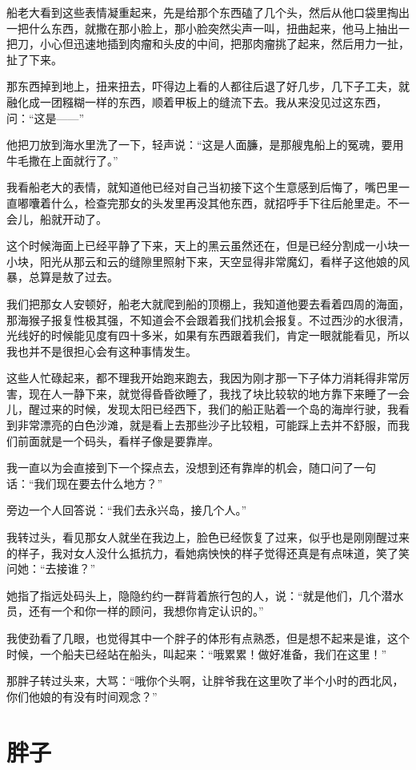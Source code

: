 船老大看到这些表情凝重起来，先是给那个东西磕了几个头，然后从他口袋里掏出一把什么东西，就撒在那小脸上，那小脸突然尖声一叫，扭曲起来，他马上抽出一把刀，小心但迅速地插到肉瘤和头皮的中间，把那肉瘤挑了起来，然后用力一扯，扯了下来。

那东西掉到地上，扭来扭去，吓得边上看的人都往后退了好几步，几下子工夫，就融化成一团糨糊一样的东西，顺着甲板上的缝流下去。我从来没见过这东西，问：“这是——”

他把刀放到海水里洗了一下，轻声说：“这是人面臁，是那艘鬼船上的冤魂，要用牛毛撒在上面就行了。”

我看船老大的表情，就知道他已经对自己当初接下这个生意感到后悔了，嘴巴里一直嘟囔着什么，检查完那女的头发里再没其他东西，就招呼手下往后舱里走。不一会儿，船就开动了。

这个时候海面上已经平静了下来，天上的黑云虽然还在，但是已经分割成一小块一小块，阳光从那云和云的缝隙里照射下来，天空显得非常魔幻，看样子这他娘的风暴，总算是敖了过去。

我们把那女人安顿好，船老大就爬到船的顶棚上，我知道他要去看着四周的海面，那海猴子报复性极其强，不知道会不会跟着我们找机会报复。不过西沙的水很清，光线好的时候能见度有四十多米，如果有东西跟着我们，肯定一眼就能看见，所以我也并不是很担心会有这种事情发生。

这些人忙碌起来，都不理我开始跑来跑去，我因为刚才那一下子体力消耗得非常厉害，现在人一静下来，就觉得昏昏欲睡了，我找了块比较软的地方靠下来睡了一会儿，醒过来的时候，发现太阳已经西下，我们的船正贴着一个岛的海岸行驶，我看到非常漂亮的白色沙滩，就是看上去那些沙子比较粗，可能踩上去并不舒服，而我们前面就是一个码头，看样子像是要靠岸。

我一直以为会直接到下一个探点去，没想到还有靠岸的机会，随口问了一句话：“我们现在要去什么地方？”

旁边一个人回答说：“我们去永兴岛，接几个人。”

我转过头，看见那女人就坐在我边上，脸色已经恢复了过来，似乎也是刚刚醒过来的样子，我对女人没什么抵抗力，看她病怏怏的样子觉得还真是有点味道，笑了笑问她：“去接谁？”

她指了指远处码头上，隐隐约约一群背着旅行包的人，说：“就是他们，几个潜水员，还有一个和你一样的顾问，我想你肯定认识的。”

我使劲看了几眼，也觉得其中一个胖子的体形有点熟悉，但是想不起来是谁，这个时候，一个船夫已经站在船头，叫起来：“哦累累！做好准备，我们在这里！”

那胖子转过头来，大骂：“哦你个头啊，让胖爷我在这里吹了半个小时的西北风，你们他娘的有没有时间观念？”

\chapter{胖子}


